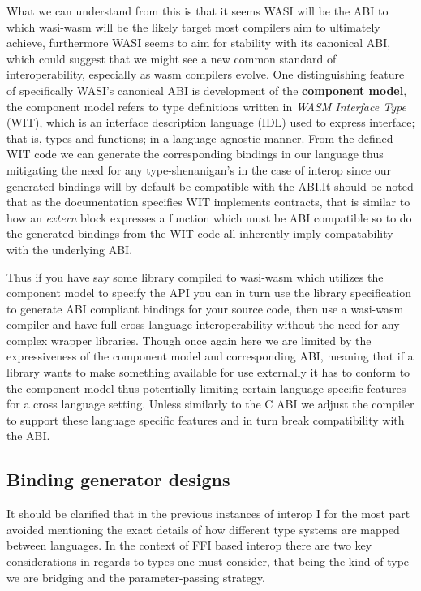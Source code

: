 What we can understand from this is that it seems WASI will be the ABI to which wasi-wasm will be the likely target most compilers aim to ultimately achieve, furthermore WASI seems to aim for stability with its canonical ABI, which could suggest that we might see a new common standard of interoperability, especially as wasm compilers evolve. One distinguishing feature of specifically WASI's canonical ABI is development of the \textbf{component model}, the component model refers to type definitions written in \textit{WASM Interface Type} (WIT), which is an interface description language (IDL) used to express interface; that is, types and functions; in a language agnostic manner\cite{WebAssemblyComponentModel}. From the defined WIT code we can generate the corresponding bindings in our language thus mitigating the need for any type-shenanigan's in the case of interop since our generated bindings will by default be compatible with the ABI.\@ It should be noted that as the documentation specifies WIT implements contracts, that is similar to how an \textit{extern} block expresses a function which must be ABI compatible so to do the generated bindings from the WIT code all inherently imply compatability with the underlying ABI.\@ 

Thus if you have say some library compiled to wasi-wasm which utilizes the component model to specify the API you can in turn use the library specification to generate ABI compliant bindings for your source code, then use a wasi-wasm compiler and have full cross-language interoperability without the need for any complex wrapper libraries. Though once again here we are limited by the expressiveness of the component model and corresponding ABI, meaning that if a library wants to make something available for use externally it has to conform to the component model thus potentially limiting certain language specific features for a cross language setting. Unless similarly to the C ABI we adjust the compiler to support these language specific features and in turn break compatibility with the ABI.\@ 

\subsection{Binding generator designs}

It should be clarified that in the previous instances of interop I for the most part avoided mentioning the exact details of how different type systems are mapped between languages. In the context of FFI based interop there are two key considerations in regards to types one must consider, that being the kind of type we are bridging and the parameter-passing strategy.


